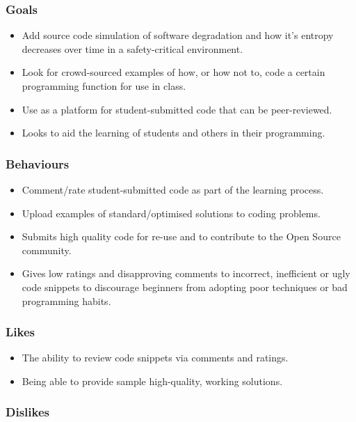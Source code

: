 \documentclass{sig-alt-release2}
\begin{document}
\subsubsection{Goals}

\begin{itemize}
\item Add source code simulation of software degradation and how it's
entropy decreases over time in a safety-critical environment.
\item Look for crowd-sourced examples of how, or how not to, code a certain
programming function for use in class.
\item Use as a platform for student-submitted code that can be peer-reviewed.
\item Looks to aid the learning of students and others in their programming.
\end{itemize}

\subsubsection{Behaviours}

\begin{itemize}
\item Comment/rate student-submitted code as part of the learning process.
\item Upload examples of standard/optimised solutions to coding problems.
\item Submits high quality code for re-use and to contribute to the Open
Source community.
\item Gives low ratings and disapproving comments to incorrect,
inefficient or ugly code snippets to discourage beginners from
adopting poor techniques or bad programming habits.
\end{itemize}

\subsubsection{Likes}

\begin{itemize}
\item The ability to review code snippets via comments and ratings.
\item Being able to provide sample high-quality, working solutions.
\end{itemize}

\subsubsection{Dislikes}
\end{document}
